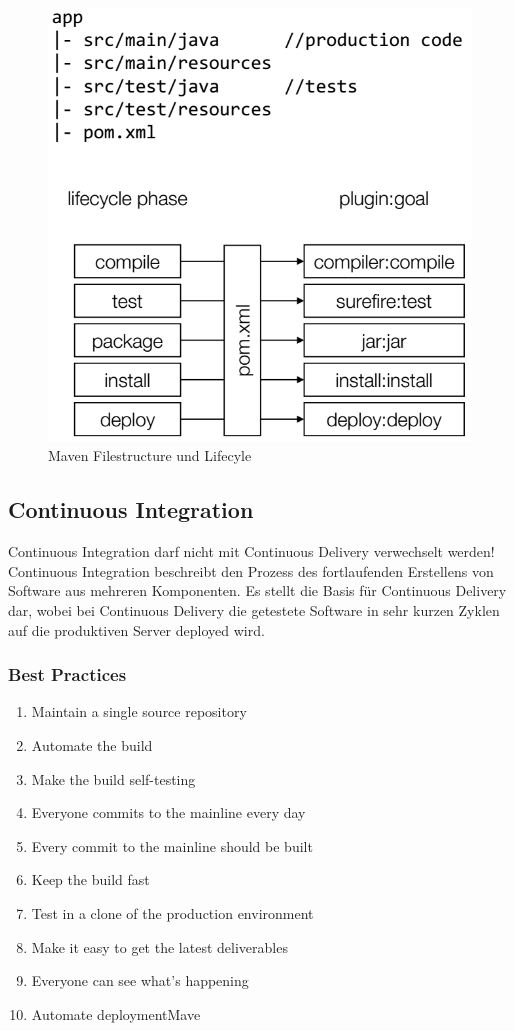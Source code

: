 \begin{figure}[h!]
	\centering
	\includegraphics[width=0.5\linewidth]{img/maven_filestructure_lifecycle}
	\caption{Maven Filestructure und Lifecyle}
	\label{fig:mavenfilestructurelifecycle}
\end{figure}

\newpage


\subsection{Continuous Integration}
Continuous Integration darf nicht mit Continuous Delivery verwechselt werden! Continuous Integration beschreibt den Prozess des fortlaufenden Erstellens von Software aus mehreren Komponenten. Es stellt die Basis für Continuous Delivery dar, wobei bei Continuous Delivery die getestete Software in sehr kurzen Zyklen auf die produktiven Server deployed wird.

\subsubsection{Best Practices}
\begin{enumerate}
	\item Maintain a single source repository 
	\item Automate the build 
	\item Make the build self-testing 
	\item Everyone commits to the mainline every day 
	\item Every commit to the mainline should be built 
	\item Keep the build fast 
	\item Test in a clone of the production environment 
	\item Make it easy to get the latest deliverables 
	\item Everyone can see what’s happening 
	\item Automate deploymentMave
\end{enumerate}


